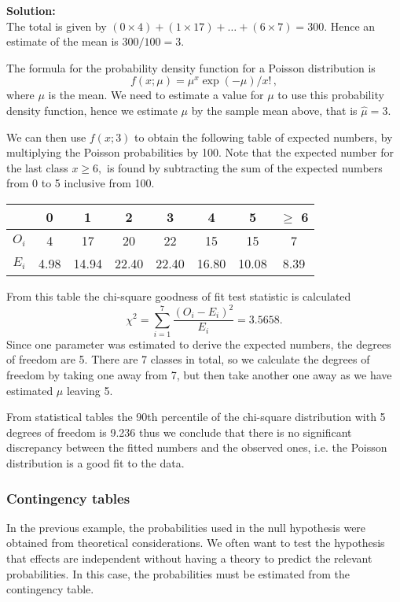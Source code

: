 \documentclass[12pt]{article}
\begin{document}
\begin{mdframed}
{\bf Solution:}\\
The total is given by $(0 \times 4)+(1 \times 17)+\ldots+(6 \times 7)=300.$ Hence an estimate of the mean is $300/100=3.$

The formula for the probability density function for a Poisson distribution is $$f(x;\mu)=\mu^{x}\exp(-\mu)/x! \, ,$$
where $\mu$ is the mean. We need to estimate a value for $\mu$ to use this probability density function, hence we estimate $\mu$ by the sample mean above, that is $\hat{\mu}=3.$

We can then use $f(x;3)$ to obtain the following table of expected numbers, by multiplying the Poisson probabilities by 100. Note that the expected number for the last class $x \geq 6,$ is found by subtracting the sum of the expected numbers from 0 to 5 inclusive from 100.
\begin{center}
\begin{tabular}{|c|c|c|c|c|c|c|c|}
  \hline
   & 0 & 1 & 2 & 3 & 4 & 5 & $\geq$ 6\\ \hline
  $O_{i}$ & 4 & 17 & 20 & 22 & 15 & 15 & 7 \\ \hline
  $E_{i}$ & 4.98 & 14.94 & 22.40 & 22.40 & 16.80 & 10.08 & 8.39 \\
  \hline
\end{tabular}
\end{center}
From this table the chi-square goodness of fit test statistic is calculated
$$
\chi^{2}=\sum_{i=1}^{7}\frac{(O_{i}-E_{i})^{2}}{E_{i}}=3.5658.
$$
Since one parameter was estimated to derive the expected numbers, the degrees of freedom are 5. There are 7 classes in total, so we calculate the degrees of freedom by taking one away from 7, but then take another one away as we have estimated $\mu$ leaving 5.

From statistical tables the 90th percentile of the chi-square distribution with 5 degrees of freedom is 9.236 thus we conclude that there is no significant discrepancy between the fitted numbers and the observed ones, i.e. the Poisson distribution is a good fit to the data.
\end{mdframed}

\subsubsection{Contingency tables}
In the previous example, the probabilities used in the null hypothesis were obtained from theoretical considerations.  We often want to test the hypothesis that effects are independent without having a theory to predict the relevant probabilities.  In this case, the probabilities must be estimated from the contingency table.
\end{document}

